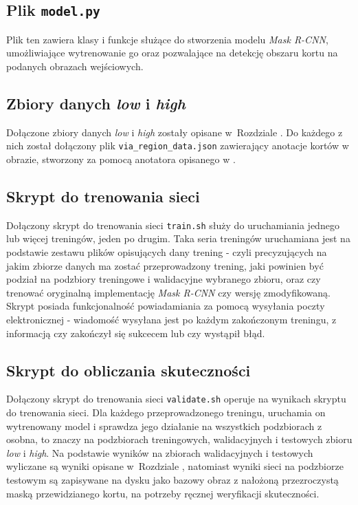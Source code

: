 \subsection*{Plik \texttt{model.py}}

Plik ten zawiera klasy i funkcje służące do stworzenia modelu \textit{Mask R-CNN}, umożliwiające wytrenowanie go oraz pozwalające na detekcję obszaru kortu na podanych obrazach wejściowych.

\subsection*{Zbiory danych \textit{low} i \textit{high}}

Dołączone zbiory danych \textit{low} i \textit{high} zostały opisane w~Rozdziale .
Do każdego z nich został dołączony plik \texttt{via\_region\_data.json} zawierający anotacje kortów w obrazie, stworzony za pomocą anotatora opisanego w .

\subsection*{Skrypt do trenowania sieci}

Dołączony skrypt do trenowania sieci \texttt{train.sh} służy do uruchamiania jednego lub więcej treningów, jeden po drugim. Taka seria treningów uruchamiana jest na podstawie zestawu plików opisujących dany trening - czyli precyzujących na jakim zbiorze danych ma zostać przeprowadzony trening, jaki powinien być podział na podzbiory treningowe i walidacyjne wybranego zbioru, oraz czy trenować oryginalną implementację \textit{Mask R-CNN} czy wersję zmodyfikowaną. Skrypt posiada funkcjonalność powiadamiania za pomocą wysyłania poczty elektronicznej - wiadomość wysyłana jest po każdym zakończonym treningu, z informacją czy zakończył się sukcecem lub czy wystąpił błąd.

\subsection*{Skrypt do obliczania skuteczności}

Dołączony skrypt do trenowania sieci \texttt{validate.sh} operuje na wynikach skryptu do trenowania sieci. Dla każdego przeprowadzonego treningu, uruchamia on wytrenowany model i sprawdza jego działanie na wszystkich podzbiorach z osobna, to znaczy na podzbiorach treningowych, walidacyjnych i testowych zbioru \textit{low} i \textit{high}. Na podstawie wyników na zbiorach walidacyjnych i testowych wyliczane są wyniki opisane w~Rozdziale , natomiast wyniki sieci na podzbiorze testowym są zapisywane na dysku jako bazowy obraz z nałożoną przezroczystą maską przewidzianego kortu, na potrzeby ręcznej weryfikacji skuteczności.
